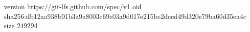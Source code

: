 version https://git-lfs.github.com/spec/v1
oid sha256:db12aa938b01b3a9a8003c69e03a9d017e215be2dced49d320e79ba60d35ea4c
size 249294

